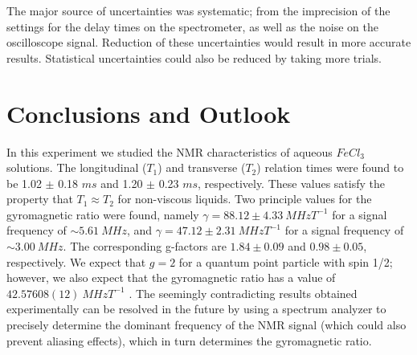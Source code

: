 \documentclass[a4paper, 12pt]{article}  %
\begin{document}
The major source of uncertainties was systematic; from the imprecision of the settings for the delay times on the spectrometer, as well as the noise on the oscilloscope signal. Reduction of these uncertainties would result in more accurate results. Statistical uncertainties could also be reduced by taking more trials.




    



\section{Conclusions and Outlook}
In this experiment we studied the NMR characteristics of aqueous $FeCl_3$ solutions. The longitudinal ($T_1$) and transverse ($T_2$) relation times were found to be 1.02 $\pm$ 0.18 $ms$ and 1.20 $\pm$ 0.23 $ms$, respectively. These values satisfy the property that $T_1 \approx T_2$ for non-viscous liquids. Two principle values for the gyromagnetic ratio were found, namely $\gamma = 88.12 \pm 4.33 \ MHzT^{-1}$ for a signal frequency of $\sim 5.61 \ MHz$, and $\gamma = 47.12 \pm 2.31 \ MHzT^{-1}$ for a signal frequency of $\sim 3.00 \ MHz$. The corresponding g-factors are $1.84 \pm 0.09$ and $0.98 \pm 0.05$, respectively. We expect that $g = 2$ for a quantum point particle with spin 1/2; however, we also expect that the gyromagnetic ratio has a value of $42.57608(12) \ MHz T^{-1}$ \cite{Gyromagnetic_ratio_NIST}. The seemingly contradicting results obtained experimentally can be resolved in the future by using a spectrum analyzer to precisely determine the dominant frequency of the NMR signal (which could also prevent aliasing effects), which in turn determines the gyromagnetic ratio.

\end{document}
